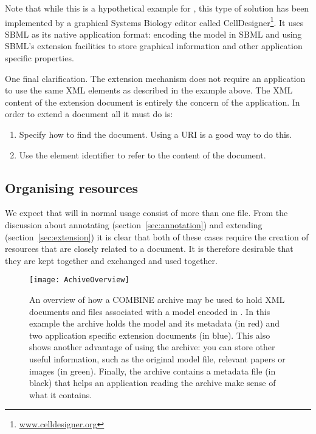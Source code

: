 Note that while this is a hypothetical example for \pharmml, this type
of solution has been implemented by a graphical Systems Biology editor
called CellDesigner\footnote{\url{www.celldesigner.org}}. It uses SBML
as its native application format: encoding the model in SBML and using
SBML's extension facilities to store graphical information and other
application specific properties.

One final clarification. The extension mechanism does not require an
application to use the same XML elements as described in the example
above. The XML content of the extension document is entirely the
concern of the application. In order to extend a \pharmml document
all it must do is:
\begin{enumerate}
\item Specify how to find the \pharmml document. Using a URI is a good
  way to do this.
\item Use the element identifier to refer to the content of the \pharmml document.
\end{enumerate}

\subsection{Organising \pharmml resources}
\label{sec:pharmml-archive}

We expect that \pharmml will in normal usage consist of more than one
file. From the discussion about annotating
(section~\ref{sec:annotation}) and extending
(section~\ref{sec:extension}) \pharmml it is clear that both of these
cases require the creation of resources that are closely
related to a \pharmml document. It is therefore desirable that they
are kept together and exchanged and used together.

\begin{figure}[htb]
\centering
  \texttt{[image: AchiveOverview]}
  \caption{An overview of how a COMBINE archive may be used to hold
    XML documents and files associated with a model encoded in
    \pharmml. In this example the archive holds the model and its
    metadata (in red) and two application specific extension
    documents (in blue). This also shows another advantage of using
    the archive: you can store other useful information, such as the
    original model file, relevant papers or images (in
    green). Finally, the archive contains a metadata file (in black)
    that helps an application reading the archive make sense of what
    it contains.}
  \label{fig:moml-archive-overview}
\end{figure}

